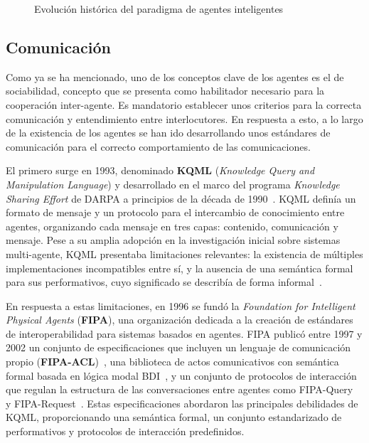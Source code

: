 \begin{figure}[h]
{ }%
\caption{Evolución histórica del paradigma de agentes inteligentes} 
\label{fig:timeline_agentes} 
\par{} 
\end{figure}


\subsection{Comunicación}
\label{subsec:comunicacion}
Como ya se ha mencionado, uno de los conceptos clave de los agentes es el de sociabilidad, concepto que se presenta como habilitador necesario para la cooperación inter-agente. Es mandatorio establecer unos criterios para la correcta comunicación y entendimiento entre interlocutores. En respuesta a esto, a lo largo de la existencia de los agentes se han ido desarrollando unos estándares de comunicación para el correcto comportamiento de las comunicaciones.

El primero surge en 1993, denominado \textbf{KQML} (\textit{Knowledge Query and Manipulation Language}) y desarrollado en el marco del programa \textit{Knowledge Sharing Effort} de DARPA a principios de la década de 1990~\cite{finin1994kqml}. KQML definía un formato de mensaje y un protocolo para el intercambio de conocimiento entre agentes, organizando cada mensaje en tres capas: contenido, comunicación y mensaje. Pese a su amplia adopción en la investigación inicial sobre sistemas multi-agente, KQML presentaba limitaciones relevantes: la existencia de múltiples implementaciones incompatibles entre sí, y la ausencia de una semántica formal para sus performativos, cuyo significado se describía de forma informal~\cite{finin1994kqml}.

En respuesta a estas limitaciones, en 1996 se fundó la \textit{Foundation for Intelligent Physical Agents} (\textbf{FIPA}), una organización dedicada a la creación de estándares de interoperabilidad para sistemas basados en agentes. FIPA publicó entre 1997 y 2002 un conjunto de especificaciones que incluyen un lenguaje de comunicación propio (\textbf{FIPA-ACL})~\cite{fipa2002acl}, una biblioteca de actos comunicativos con semántica formal basada en lógica modal BDI~\cite{fipa2002cal}, y un conjunto de protocolos de interacción que regulan la estructura de las conversaciones entre agentes como FIPA-Query~\cite{fipa2002query} y FIPA-Request~\cite{fipa2002request}. Estas especificaciones abordaron las principales debilidades de KQML, proporcionando una semántica formal, un conjunto estandarizado de performativos y protocolos de interacción predefinidos.

